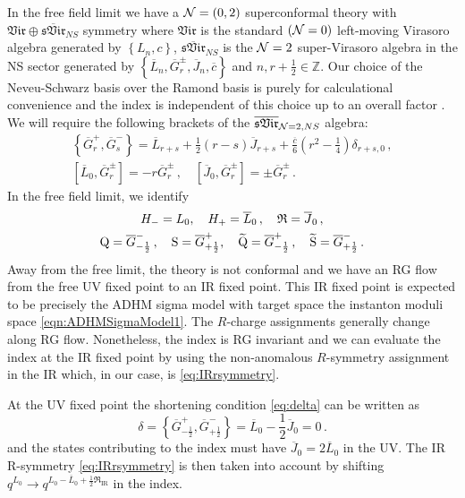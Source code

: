 \documentclass[main.tex]{subfiles}
\begin{document}
In the free field limit we have a $\mathcal{N}=(0,2)$ superconformal theory with  $\mathfrak{Vir}\oplus\overline{\mathfrak{sVir}}_{NS}$ symmetry where $\mathfrak{Vir}$ is the standard $(\mathcal{N}=0)$ left-moving Virasoro algebra generated by $\left\{L_n,c\right\}$, $\overline{\mathfrak{sVir}}_{NS}$ is the $\mathcal{N}=2$ super-Virasoro algebra in the NS sector generated by $\left\{\overline{L}_n,\overline{G}^{\pm}_r,\overline{J}_n,\overline{c}\right\}$ and $n,r+\frac{1}{2}\in\mathbb{Z}$. Our choice of the Neveu-Schwarz basis over the Ramond basis is purely for calculational convenience and the index is independent of this choice up to an overall factor \cite{Cordova:2017ohl}. We will require the following brackets of the $\overline{\mathfrak{sVir}}_{\mathcal{N}=2,NS}$ algebra:
\begin{gather}
\left\{\overline{G}^+_r,\overline{G}^-_s\right\}=\overline{L}_{r+s}+\frac{1}{2}(r-s)\overline{J}_{r+s}+\frac{\overline{c}}{6}\left(r^2-\frac{1}{4}\right)\delta_{r+s,0}\,,\\
\left[\overline{L}_0,\overline{G}^{\pm}_{r}\right]=-r\overline{G}^{\pm}_{r}\,,\quad \left[\overline{J}_0,\overline{G}^{\pm}_{r}\right]=\pm\overline{G}^{\pm}_{r}\,.
\end{gather}
In the free field limit, we identify 
\begin{gather}
H_-=L_0,\quad H_+=\overline{L}_0\,,\quad \mathfrak{R}=\overline{J}_0\,,\\ \mathrm{Q}=\overline{G}^{-}_{-\frac{1}{2}}\,,\quad \mathrm{S}=\overline{G}^{+}_{+\frac{1}{2}},\quad \widetilde{\mathrm{Q}}=\overline{G}^{+}_{-\frac{1}{2}}\,,\quad \widetilde{\mathrm{S}}=\overline{G}^{-}_{+\frac{1}{2}} \, .
\end{gather}
%
Away from the free limit, the theory is not conformal and we have an RG flow from the free UV fixed point to an IR fixed point. This IR fixed point is expected to be precisely the ADHM sigma model with target space the instanton moduli space \eqref{eqn:ADHMSigmaModel1}. The $R$-charge assignments generally change along RG flow. Nonetheless, the index is RG invariant and we can evaluate the index at the IR fixed point by using the non-anomalous $R$-symmetry assignment in the IR which, in our case, is \eqref{eq:IRrsymmetry}.

At the UV fixed point the shortening condition  \eqref{eq:delta} can be written as
\begin{equation}\label{eqn:bpscondition}
\delta=\left\{\overline{G}^+_{-\frac{1}{2}},\overline{G}^-_{+\frac{1}{2}}\right\}=\overline{L}_{0}-\frac{1}{2}\overline{J}_{0}=0\,.
\end{equation}
and the states contributing to the index must have $\overline{J}_0=2\overline{L}_0$ in the UV. The IR R-symmetry \eqref{eq:IRrsymmetry} is then taken into account by shifting $q^{L_0}\to q^{L_0-\overline{L}_0+\frac{1}{2}\mathfrak{R}_\text{IR}}$ in the index.
\end{document}
